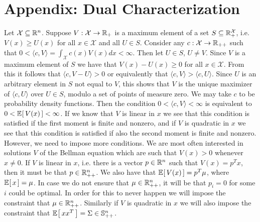 \documentclass{article}
\begin{document}
\section{Appendix: Dual Characterization}
%
Let $\mathcal X\subseteq \mathbb{R}^n$. 
Suppose $V:\mathcal X\rightarrow\mathbb{R}_+$ is a maximum element of a set $S\subseteq \mathbb{R}_+^{\mathcal X}$, i.e.
$V(x)\geq U(x)$ for all $x\in\mathcal X$ and all $U\in S$.
Consider any $c:\mathcal X\rightarrow \mathbb{R}_{++}$ 
such that $0<\langle c,V\rangle=\int_{\mathcal X}c(x)V(x)dx<\infty$. 
Then let $U\in S$, $U\neq V$. Since $V$ is a maximum
element of $S$ we have that $V(x)-U(x)\geq 0$ for all $x\in\mathcal X$. From this it follows that 
$\langle c,V-U\rangle>0$ or equivalently that $\langle c,V\rangle > \langle c,U\rangle$. Since
$U$ is an arbitrary element in $S$ not equal to $V$, this shows that $V$ is the unique maximizer of 
$\langle c,U\rangle$ over $U\in S$, modulo a set of points of measure zero. 
We may take $c$ to be probability density functions. Then the condition 
$0<\langle c,V\rangle<\infty$ is equivalent to  $0<\operatorname{\mathbb{E}}_{}\!\left[\,V(x)\,\right]<\infty$.  If we know that 
$V$ is linear in $x$ we see that this condition is satisfied if the first moment is finite and
nonzero, and if
$V$ is quadratic in $x$ we see that this condition is satisfied if also the second moment is finite and
nonzero. However, we need to impose more conditions. We are most often interested in solutions
$V$ of the Bellman equation which are such that $V(x)>0$ whenever $x\neq 0$. 
If $V$ is linear in $x$, i.e. there is a vector $p\in\mathbb{R}^n$ such that $V(x)=p^Tx$, then it must be
that $p\in\mathbb{R}_{++}^n$. We also have that $\operatorname{\mathbb{E}}_{}\!\left[\,V(x)\,\right]=p^T\mu$, where $\operatorname{\mathbb{E}}_{}\!\left[\,x\,\right]=\mu$. In case we do not 
ensure that $\mu\in\mathbb{R}_{++}^n$, it will be that $p_i=0$ for some $i$ could be optimal. In order for 
this to never happen we will impose the constraint that $\mu\in\mathbb{R}_{++}^n$. Similarly if 
$V$ is quadratic in $x$ we will also impose the constraint that  $\operatorname{\mathbb{E}}_{}\!\left[\,xx^T\,\right]=\Sigma\in
\mathbb{S}_{++}^n$. 
%

\end{document}
